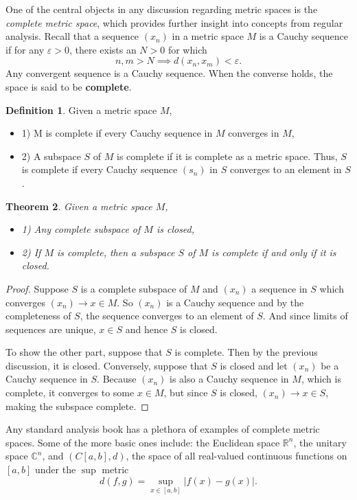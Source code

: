\documentclass[psamsfonts]{amsart}
\newtheorem{thm}{Theorem}[section]
\theoremstyle{definition}
\newtheorem{defn}[thm]{Definition}
\theoremstyle{remark}
\numberwithin{equation}{section}
\begin{document}
One of the central objects in any discussion regarding metric spaces is the \textit{complete metric space}, which provides further insight into concepts from regular analysis. Recall that a sequence $(x_n)$ in a metric space $M$ is a Cauchy sequence if for any $\varepsilon > 0$, there exists an $N> 0$ for which 
$$n, m > N \implies d(x_n, x_m ) < \varepsilon . $$
Any convergent sequence is a Cauchy sequence. When the converse holds, the space is said to be \textbf{complete}. 

\begin{defn}
Given a metric space $M$, 
\begin{itemize}
    \item 1) M is complete if every Cauchy sequence in $M$ converges in $M$, 
    \item 2) A subspace $S$ of $M$ is complete if it is complete as a metric space. Thus, $S$ is complete if every Cauchy sequence $(s_n)$ in $S$ converges to an element in $S$. 
\end{itemize}
\end{defn}

\begin{thm}
Given a metric space $M$, 
\begin{itemize}
    \item 1) Any complete subspace of $M$ is closed, 
    \item 2) If $M$ is complete, then a subspace $S$ of $M$ is complete if and only if it is closed.
\end{itemize}
\end{thm}

\begin{proof}
Suppose $S$ is a complete subspace of $M$ and $(x_n)$ a sequence in $S$ which converges $(x_n) \rightarrow x \in M$. So $(x_n)$ is a Cauchy sequence and by the completeness of $S$, the sequence converges to an element of $S$. And since limits of sequences are unique, $x \in S$ and hence $S$ is closed. 

To show the other part, suppose that $S$ is complete. Then by the previous discussion, it is closed. Conversely, suppose that $S$ is closed and let $(x_n)$ be a Cauchy sequence in $S$. Because $(x_n)$ is also a Cauchy sequence in $M$, which is complete, it converges to some $x \in M$, but since $S$ is closed, $(x_n) \rightarrow x \in S$, making the subspace complete. 
\end{proof}

Any standard analysis book has a plethora of examples of complete metric spaces. Some of the more basic ones include: the Euclidean space $\mathbb{R}^n$, the unitary space $\mathbb{C}^n$, and $(C[a,b], d)$, the space of all real-valued continuous functions on $[a,b]$ under the $\sup$ metric 
$$d(f,g) = \sup _{x \in [a,b]} |f(x) - g(x)|.$$
\end{document}
